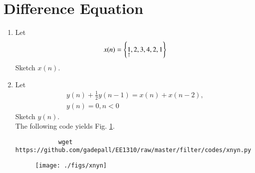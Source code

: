 \documentclass[journal,12pt,twocolumn]{IEEEtran}
\renewcommand\thesection{\arabic{section}}
\begin{document}
	\section{Difference Equation}
	\begin{enumerate}[label=\thesection.\arabic*,ref=\thesection.\theenumi]
		\item Let
		\begin{equation}
			x(n) = \left\{\underset{\uparrow}{1},2,3,4,2,1\right\}
		\end{equation}
		Sketch $x(n)$.
		\item Let
		\begin{multline}
			\label{eq:iir_filter}
			y(n) + \frac{1}{2}y(n-1) = x(n) + x(n-2), 
			\\
			y(n) = 0, n < 0
		\end{multline}
		Sketch $y(n)$.
		\\
		\solution The following code yields Fig. \ref{fig:xnyn}.
		\begin{lstlisting}
			wget https://github.com/gadepall/EE1310/raw/master/filter/codes/xnyn.py
		\end{lstlisting}
		\begin{figure}[!ht]
			\begin{center}
				\texttt{[image: ./figs/xnyn]}
			\end{center}
			\label{fig:xnyn}	
		\end{figure}
		
	\end{enumerate}
\end{document}
